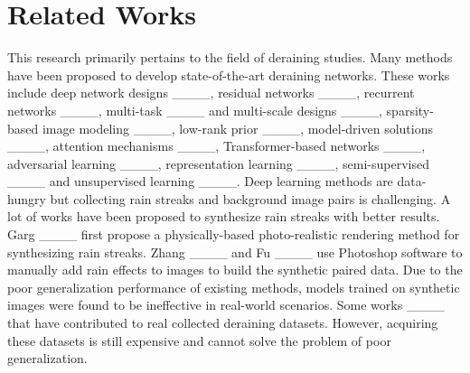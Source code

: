 \section{Related Works}
\label{sec:related}
%
This research primarily pertains to the field of deraining studies.
%
Many methods have been proposed to develop state-of-the-art deraining networks.
%
These works include deep network designs ____, residual networks ____, recurrent networks ____, multi-task ____ and multi-scale designs ____, sparsity-based image modeling ____, low-rank prior ____, model-driven solutions ____, attention mechanisms ____, Transformer-based networks ____, adversarial learning ____, representation learning ____, semi-supervised ____ and unsupervised learning ____.
%
Deep learning methods are data-hungry but collecting rain streaks and background image pairs is challenging.
%
A lot of works have been proposed to synthesize rain streaks with better results.
%
Garg \etal ____ first propose a physically-based photo-realistic rendering method for synthesizing rain streaks.
%
Zhang \etal ____ and Fu \etal ____ use Photoshop software to manually add rain effects to images to build the synthetic paired data.
%
Due to the poor generalization performance of existing methods, models trained on synthetic images were found to be ineffective in real-world scenarios.
%
Some works ____ that have contributed to real collected deraining datasets.
%
However, acquiring these datasets is still expensive and cannot solve the problem of poor generalization.

